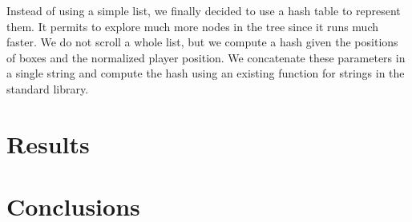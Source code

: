 \documentclass[a4paper,10pt]{article}
\begin{document}
    Instead of using a simple list, we finally decided to use a hash table to represent them. 
    It permits to explore much more nodes in the tree since it runs much faster. 
    We do not scroll a whole list, but we compute a hash given the positions of boxes and the normalized player position. 
    We concatenate these parameters in a single string and compute the hash using an existing function for strings in the standard library.


\section{Results}

\section{Conclusions}
   
      
 
 
	
\end{document}
